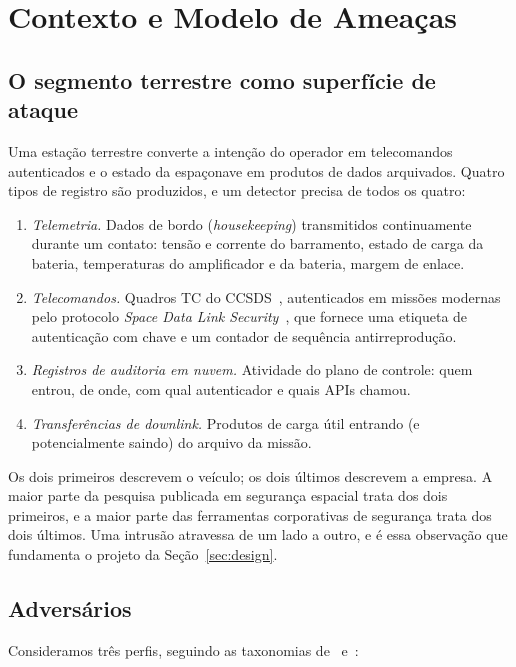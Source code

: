 \documentclass[conference]{IEEEtran}
\begin{document}
\section{Contexto e Modelo de Ameaças}
\label{sec:background}

\subsection{O segmento terrestre como superfície de ataque}

Uma estação terrestre converte a intenção do operador em telecomandos
autenticados e o estado da espaçonave em produtos de dados arquivados. Quatro
tipos de registro são produzidos, e um detector precisa de todos os quatro:

\begin{enumerate}
  \item \emph{Telemetria.} Dados de bordo (\emph{housekeeping}) transmitidos
  continuamente durante um contato: tensão e corrente do barramento, estado de
  carga da bateria, temperaturas do amplificador e da bateria, margem de
  enlace.
  \item \emph{Telecomandos.} Quadros TC do CCSDS~\cite{ccsds232}, autenticados em
  missões modernas pelo protocolo \emph{Space Data Link
  Security}~\cite{ccsds355}, que fornece uma etiqueta de autenticação com chave
  e um contador de sequência antirreprodução.
  \item \emph{Registros de auditoria em nuvem.} Atividade do plano de controle:
  quem entrou, de onde, com qual autenticador e quais APIs chamou.
  \item \emph{Transferências de \emph{downlink}.} Produtos de carga útil
  entrando (e potencialmente saindo) do arquivo da missão.
\end{enumerate}

Os dois primeiros descrevem o veículo; os dois últimos descrevem a empresa. A
maior parte da pesquisa publicada em segurança espacial trata dos dois
primeiros, e a maior parte das ferramentas corporativas de segurança trata dos
dois últimos. Uma intrusão atravessa de um lado a outro, e é essa observação que
fundamenta o projeto da Seção~\ref{sec:design}.

\subsection{Adversários}

Consideramos três perfis, seguindo as taxonomias
de~\cite{manulis2021newspace} e~\cite{falco2019principles}:
\end{document}
